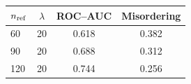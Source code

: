 \begin{tabular}{lccc}
\toprule
$n_{\rm ref}$ & $\lambda$ & ROC--AUC & Misordering \\
\midrule
60 & 20 & 0.618 & 0.382 \\
90 & 20 & 0.688 & 0.312 \\
120 & 20 & 0.744 & 0.256 \\
\bottomrule
\end{tabular}
